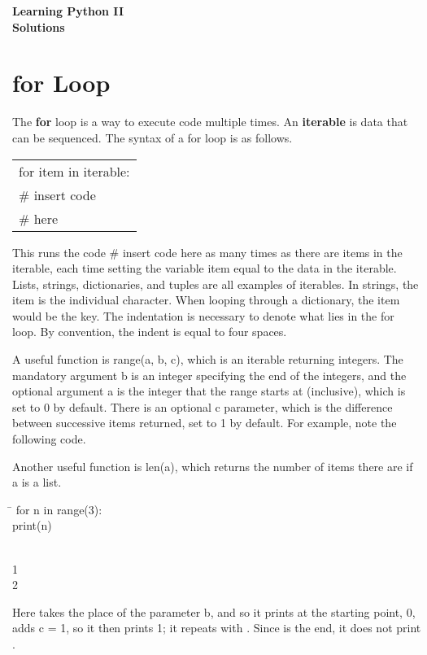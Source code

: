 \documentclass{article}
\newcommand{\icode}[1]{{\ttfamily #1}}
\newenvironment{code}{\begin{tcolorbox}\ttfamily}{\end{tcolorbox}}
\newenvironment{out}{\begin{tcolorbox}[colback=output]\ttfamily}{\end{tcolorbox}}
\begin{document}
\begin{center}
	{\LARGE\textbf{Learning Python II}}\\[.25 cm]
	{\LARGE\textbf{Solutions}}
\end{center}
\vspace{0.5 cm}
\section{\icode{for} Loop}
The \icode{\textbf{for}} loop is a way to execute code multiple times. An \textbf{iterable} is data that can be sequenced. The syntax of a \icode{for} loop is as follows.
\begin{center} \ttfamily
\begin{tabular}{|l}
for item in iterable:\\
\hspace{2 em}\# insert code\\
\hspace{2 em}\# here
\end{tabular}
\end{center}
This runs the code \icode{\# insert code here} as many times as there are items in the \icode{iterable}, each time setting the variable \icode{item} equal to the data in the iterable. Lists, strings, dictionaries, and tuples are all examples of iterables. In strings, the item is the individual character. When looping through a dictionary, the item would be the key. The indentation is necessary to denote what lies in the for loop. By convention, the indent is equal to four spaces.

A useful function is \icode{range(a, b, c)}, which is an iterable returning integers. The mandatory argument \icode{b} is an integer specifying the end of the integers, and the optional argument \icode{a} is the integer that the \icode{range} starts at (inclusive), which is set to 0 by default. There is an optional \icode{c} parameter, which is the difference between successive items returned, set to 1 by default. For example, note the following code.

Another useful function is \icode{len(a)}, which returns the number of items there are if \icode{a} is a list.

\begin{code}
\begin{tabbing}
	\hspace{3.25 in}\=\hspace{3.25 in} \kill
	for n in range(3):\>\\
	\hspace{2 em}print(n)\>
\end{tabbing}
\end{code}
\begin{out}
0\\
1\\
2
\end{out}
Here \icode{3} takes the place of the parameter \icode{b}, and so it prints at the starting point, 0, adds \icode{c = 1}, so it then prints 1; it repeats with \icode{2}. Since \icode{3} is the end, it does not print \icode{3}.
\end{document}
